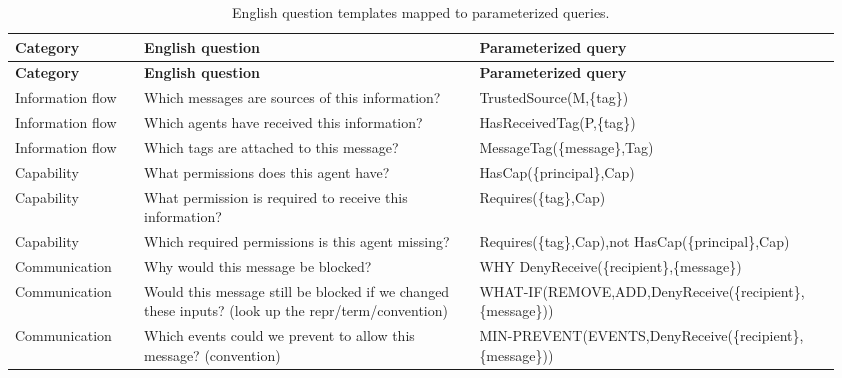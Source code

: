 \documentclass[10pt]{article}
\begin{document}
\begingroup
\small
\setlength{\tabcolsep}{4pt}
\renewcommand{\arraystretch}{1.2}
\begin{longtable}{@{}>{\raggedright\arraybackslash}p{0.15\linewidth} >{\raggedright\arraybackslash}p{0.39\linewidth} >{\raggedright\arraybackslash}p{0.42\linewidth}@{}}
\caption{English question templates mapped to parameterized queries.}\label{tab:question-catalog}\\
\toprule
\textbf{Category} & \textbf{English question} & \textbf{Parameterized query}\\
\midrule
\endfirsthead
\toprule
\textbf{Category} & \textbf{English question} & \textbf{Parameterized query}\\
\midrule
\endhead
\bottomrule
\endfoot
Information flow & Which messages are sources of this information? & {\ttfamily\footnotesize TrustedSource(\allowbreak M,\allowbreak \{tag\})} \\
\addlinespace[4pt]
Information flow & Which agents have received this information? & {\ttfamily\footnotesize HasReceivedTag(\allowbreak P,\allowbreak \{tag\})} \\
\addlinespace[4pt]
Information flow & Which tags are attached to this message? & {\ttfamily\footnotesize MessageTag(\allowbreak \{message\},\allowbreak Tag)} \\
\addlinespace[4pt]
Capability & What permissions does this agent have? & {\ttfamily\footnotesize HasCap(\allowbreak \{principal\},\allowbreak Cap)} \\
\addlinespace[4pt]
Capability & What permission is required to receive this information? & {\ttfamily\footnotesize Requires(\allowbreak \{tag\},\allowbreak Cap)} \\
\addlinespace[4pt]
Capability & Which required permissions is this agent missing? & {\ttfamily\footnotesize Requires(\allowbreak \{tag\},\allowbreak Cap),\allowbreak not HasCap(\allowbreak \{principal\},\allowbreak Cap)} \\
\addlinespace[4pt]
Communication & Why would this message be blocked? & {\ttfamily\footnotesize WHY DenyReceive(\allowbreak \{recipient\},\allowbreak \{message\})} \\
\addlinespace[4pt]
Communication & Would this message still be blocked if we changed these inputs? (look up the repr/term/convention) & {\ttfamily\footnotesize WHAT-IF(\allowbreak REMOVE,\allowbreak ADD,\allowbreak DenyReceive(\allowbreak \{recipient\},\allowbreak \{message\}))} \\
\addlinespace[4pt]
Communication & Which events could we prevent to allow this message? (convention) & {\ttfamily\footnotesize MIN-PREVENT(\allowbreak EVENTS,\allowbreak DenyReceive(\allowbreak \{recipient\},\allowbreak \{message\}))} \\

\end{longtable}
\end{document}
